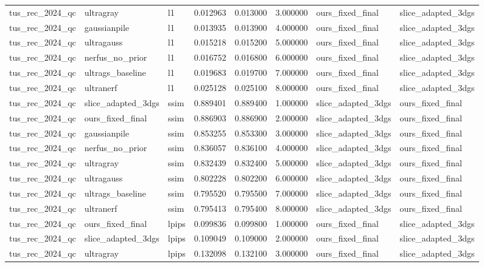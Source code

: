 \begin{tabular}{llllllll}
tus\_rec\_2024\_qc & ultragray & l1 & 0.012963 & 0.013000 & 3.000000 & ours\_fixed\_final & slice\_adapted\_3dgs \\
tus\_rec\_2024\_qc & gaussianpile & l1 & 0.013935 & 0.013900 & 4.000000 & ours\_fixed\_final & slice\_adapted\_3dgs \\
tus\_rec\_2024\_qc & ultragauss & l1 & 0.015218 & 0.015200 & 5.000000 & ours\_fixed\_final & slice\_adapted\_3dgs \\
tus\_rec\_2024\_qc & nerfus\_no\_prior & l1 & 0.016752 & 0.016800 & 6.000000 & ours\_fixed\_final & slice\_adapted\_3dgs \\
tus\_rec\_2024\_qc & ultrags\_baseline & l1 & 0.019683 & 0.019700 & 7.000000 & ours\_fixed\_final & slice\_adapted\_3dgs \\
tus\_rec\_2024\_qc & ultranerf & l1 & 0.025128 & 0.025100 & 8.000000 & ours\_fixed\_final & slice\_adapted\_3dgs \\
tus\_rec\_2024\_qc & slice\_adapted\_3dgs & ssim & 0.889401 & 0.889400 & 1.000000 & slice\_adapted\_3dgs & ours\_fixed\_final \\
tus\_rec\_2024\_qc & ours\_fixed\_final & ssim & 0.886903 & 0.886900 & 2.000000 & slice\_adapted\_3dgs & ours\_fixed\_final \\
tus\_rec\_2024\_qc & gaussianpile & ssim & 0.853255 & 0.853300 & 3.000000 & slice\_adapted\_3dgs & ours\_fixed\_final \\
tus\_rec\_2024\_qc & nerfus\_no\_prior & ssim & 0.836057 & 0.836100 & 4.000000 & slice\_adapted\_3dgs & ours\_fixed\_final \\
tus\_rec\_2024\_qc & ultragray & ssim & 0.832439 & 0.832400 & 5.000000 & slice\_adapted\_3dgs & ours\_fixed\_final \\
tus\_rec\_2024\_qc & ultragauss & ssim & 0.802228 & 0.802200 & 6.000000 & slice\_adapted\_3dgs & ours\_fixed\_final \\
tus\_rec\_2024\_qc & ultrags\_baseline & ssim & 0.795520 & 0.795500 & 7.000000 & slice\_adapted\_3dgs & ours\_fixed\_final \\
tus\_rec\_2024\_qc & ultranerf & ssim & 0.795413 & 0.795400 & 8.000000 & slice\_adapted\_3dgs & ours\_fixed\_final \\
tus\_rec\_2024\_qc & ours\_fixed\_final & lpips & 0.099836 & 0.099800 & 1.000000 & ours\_fixed\_final & slice\_adapted\_3dgs \\
tus\_rec\_2024\_qc & slice\_adapted\_3dgs & lpips & 0.109049 & 0.109000 & 2.000000 & ours\_fixed\_final & slice\_adapted\_3dgs \\
tus\_rec\_2024\_qc & ultragray & lpips & 0.132098 & 0.132100 & 3.000000 & ours\_fixed\_final & slice\_adapted\_3dgs \\

\end{tabular}
